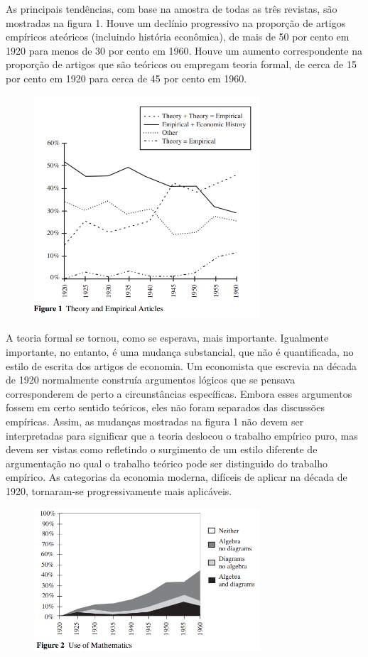 \documentclass[12pt]{article}
\begin{document}
As principais tendências, com base na amostra de todas as três revistas, são mostradas na figura 1. Houve um declínio progressivo na proporção de artigos empíricos ateóricos (incluindo história econômica), de mais de 50 por cento em 1920 para menos de 30 por cento em 1960. Houve um aumento correspondente na proporção de artigos que são teóricos ou empregam teoria formal, de cerca de 15 por cento em 1920 para cerca de 45 por cento em 1960. 
 \begin{figure}[H]
    \centering
    \includegraphics[width=0.75\textwidth]{figure 1.png}
    \end{figure}


A teoria formal se tornou, como se esperava, mais importante. Igualmente importante, no entanto, é uma mudança substancial, que não é quantificada, no estilo de escrita dos artigos de economia. Um economista que escrevia na década de 1920 normalmente construía argumentos lógicos que se pensava corresponderem de perto a circunstâncias específicas. Embora esses argumentos fossem em certo sentido teóricos, eles não foram separados das discussões empíricas. Assim, as mudanças mostradas na figura 1 não devem ser interpretadas para significar que a teoria deslocou o trabalho empírico puro, mas devem ser vistas como refletindo o surgimento de um estilo diferente de argumentação no qual o trabalho teórico pode ser distinguido do trabalho empírico. As categorias da economia moderna, difíceis de aplicar na década de 1920, tornaram-se progressivamente mais aplicáveis.

 \begin{figure}[H]
    \centering
    \includegraphics[width=0.75\textwidth]{figure 2.png}
    \end{figure}
\end{document}
